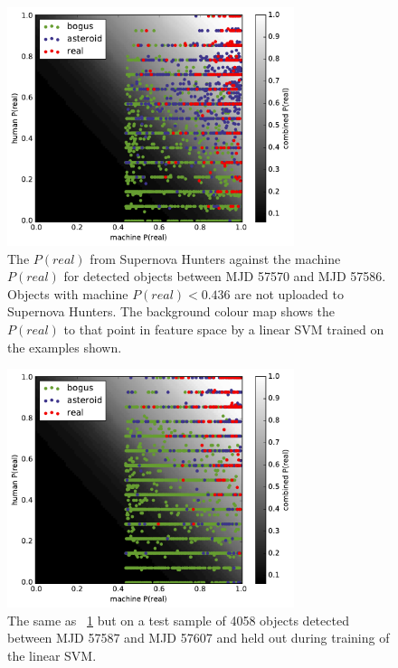 \documentclass[a4paper,fleqn,usenatbib]{mnras}
\begin{document}
\begin{figure}
   \includegraphics[width=84mm]{figs/human_v_machine_train.pdf}
   \caption{The $P(real)$ from Supernova Hunters against the machine $P(real)$ for detected 
            objects between MJD 57570 and MJD 57586.  Objects with machine $P(real) < 0.436$ are
            not uploaded to Supernova Hunters.  The background colour map shows 
            the $P(real)$ to that point in feature space by a linear SVM trained on the 
            examples shown.}
   \label{fig:combo_train} 
\end{figure}

\begin{figure}
   \includegraphics[width=84mm]{figs/human_v_machine_test.pdf}
   \caption{The same as ~\ref{fig:combo_train} but on a test sample of 4058 objects detected between
            MJD 57587 and MJD 57607 and held out during training of the linear SVM.} 
   \label{fig:combo_test} 
\end{figure}
\end{document}
